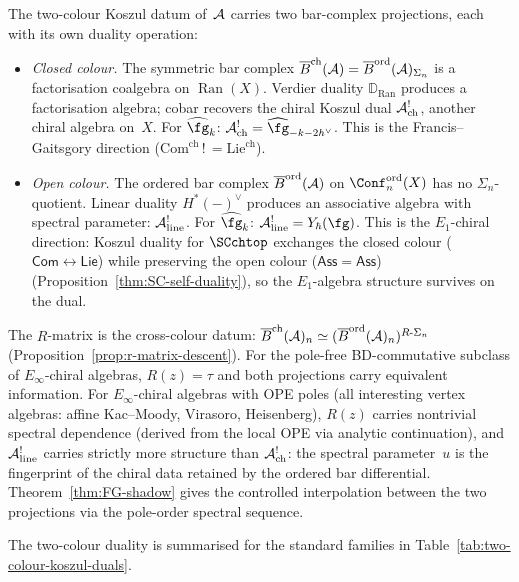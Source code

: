\begin{construction}
\begin{remark}%
\label{rem:two-colour-architecture}%
The two-colour Koszul datum of~$\mathcal{A}$
carries two bar-complex projections, each with its own
duality operation:
\begin{itemize}[nosep]
\item \emph{Closed colour.}
 The symmetric bar complex
 $\overline{B}^{\mathrm{ch}}(\mathcal{A}) = \overline{B}^{\mathrm{ord}}(\mathcal{A})_{\Sigma_n}$
 is a factorisation coalgebra on $\operatorname{Ran}(X)$.
 Verdier duality $\mathbb{D}_{\operatorname{Ran}}$
 produces a factorisation algebra; cobar recovers the
 chiral Koszul dual $\mathcal{A}^!_{\mathrm{ch}}$, another
 chiral algebra on~$X$. For $\widehat{\fg}_k$:
 $\cA^!_{\mathrm{ch}} = \widehat{\fg}_{-k-2h^\vee}$.
 This is the Francis--Gaitsgory direction
 ($\mathrm{Com}^{\mathrm{ch}}\,!\,=
 \mathrm{Lie}^{\mathrm{ch}}$).
\item \emph{Open colour.}
 The ordered bar complex
 $\overline{B}^{\mathrm{ord}}(\mathcal{A})$ on
 $\Conf_n^{\mathrm{ord}}(X)$ has no $\Sigma_n$-quotient.
 Linear duality $H^*(-)^\vee$ produces an associative
 algebra with spectral parameter:
 $\mathcal{A}^!_{\mathrm{line}}$. For $\widehat{\fg}_k$:
 $\cA^!_{\mathrm{line}} = Y_\hbar(\fg)$.
 This is the $E_1$-chiral direction: Koszul duality
 for $\SCchtop$ exchanges the closed colour
 ($\mathsf{Com} \leftrightarrow \mathsf{Lie}$) while
 preserving the open colour ($\mathsf{Ass} = \mathsf{Ass}$)
 (Proposition~\ref{thm:SC-self-duality}), so the
 $E_1$-algebra structure survives on the dual.
\end{itemize}
The $R$-matrix is the cross-colour datum:
$\overline{B}^{\mathrm{ch}}(\mathcal{A})_n \simeq
(\overline{B}^{\mathrm{ord}}(\mathcal{A})_n)^{R\text{-}\Sigma_n}$
(Proposition~\ref{prop:r-matrix-descent}). For
the pole-free BD-commutative subclass of
$E_\infty$-chiral algebras, $R(z) = \tau$ and both
projections carry equivalent information. For
$E_\infty$-chiral algebras with OPE poles
(all interesting vertex algebras: affine Kac--Moody,
Virasoro, Heisenberg),
$R(z)$ carries nontrivial spectral dependence
(derived from the local OPE via analytic
continuation), and $\mathcal{A}^!_{\mathrm{line}}$ carries
strictly more structure than $\mathcal{A}^!_{\mathrm{ch}}$:
the spectral parameter~$u$ is the fingerprint of the
chiral data retained by the ordered bar differential.
Theorem~\ref{thm:FG-shadow} gives the controlled
interpolation between the two projections via the
pole-order spectral sequence.

The two-colour duality is summarised for the standard families
in Table~\ref{tab:two-colour-koszul-duals}.
\end{remark}


\end{construction}
